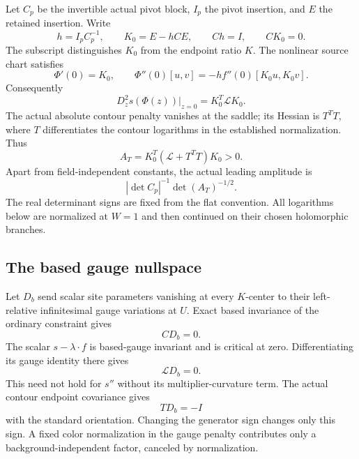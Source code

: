 Let $C_p$ be the invertible actual pivot block, $I_p$ the pivot
insertion, and $E$ the retained insertion. Write
\begin{equation}
 h=I_pC_p^{-1},\qquad K_0=E-hCE,\qquad
 Ch=I,\qquad CK_0=0.
 \label{dgb-chart-linear}
\end{equation}
The subscript distinguishes $K_0$ from the endpoint ratio $K$.
The nonlinear source chart satisfies
\begin{equation}
 \Phi'(0)=K_0,\qquad
 \Phi''(0)[u,v]=-h f''(0)[K_0u,K_0v].
 \label{dgb-chart-curvature}
\end{equation}
Consequently
\[
 D_z^2s(\Phi(z))\big|_{z=0}=K_0^T\mathcal L K_0 .
\]
The actual absolute contour penalty vanishes at the saddle;
its Hessian is $T^TT$, where $T$ differentiates the contour
logarithms in the established normalization. Thus
\begin{equation}
 A_T=K_0^T(\mathcal L+T^TT)K_0>0.
 \label{dgb-actual-precision}
\end{equation}
Apart from field-independent constants, the actual leading
amplitude is
\begin{equation}
                  |\det C_p|^{-1}\det(A_T)^{-1/2}.
 \label{dgb-actual-amplitude}
\end{equation}
The real determinant signs are fixed from the flat convention.
All logarithms below are normalized at $W=1$ and then continued
on their chosen holomorphic branches.

\subsection{The based gauge nullspace}
\label{dgb-nullspace-section}

Let $D_b$ send scalar site parameters vanishing at every
$K$-center to their left-relative infinitesimal gauge variations
at $U$. Exact based invariance of the ordinary constraint gives
\begin{equation}
                              CD_b=0.
 \label{dgb-based-constraint}
\end{equation}
The scalar $s-\lambda\cdot f$ is based-gauge invariant and is
critical at zero. Differentiating its gauge identity there gives
\begin{equation}
                              \mathcal L D_b=0.
 \label{dgb-based-null}
\end{equation}
This need not hold for $s''$ without its multiplier-curvature
term. The actual contour endpoint covariance gives
\begin{equation}
                              TD_b=-I
 \label{dgb-contour-gauge}
\end{equation}
with the standard orientation. Changing the generator sign
changes only this sign. A fixed color normalization in the
gauge penalty contributes only a background-independent
factor, canceled by normalization.

